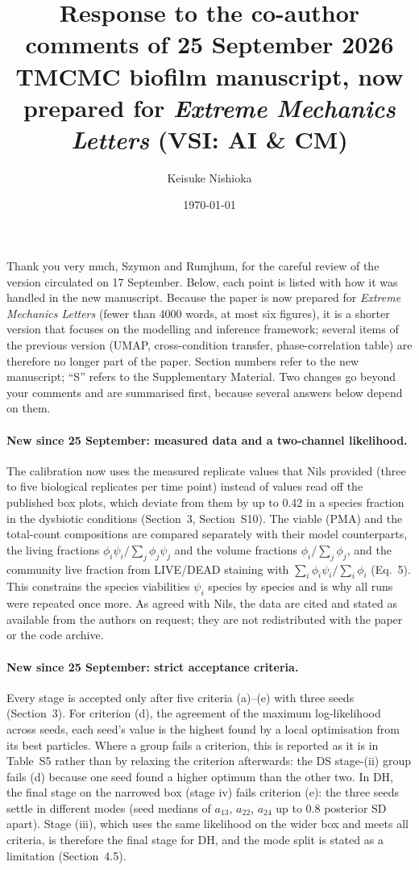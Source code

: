 \documentclass[11pt,a4paper]{article}
\title{Response to the co-author comments of 25 September 2026\\[2pt]
\large TMCMC biofilm manuscript, now prepared for \textit{Extreme Mechanics Letters} (VSI: AI \& CM)}
\author{Keisuke Nishioka}
\date{\today}
\begin{document}
\maketitle

\noindent Thank you very much, Szymon and Rumjhum, for the careful review of the version circulated on 17 September.
Below, each point is listed with how it was handled in the new manuscript.
Because the paper is now prepared for \textit{Extreme Mechanics Letters} (fewer than 4000 words, at most six figures), it is a shorter version that focuses on the modelling and inference framework; several items of the previous version (UMAP, cross-condition transfer, phase-correlation table) are therefore no longer part of the paper.
Section numbers refer to the new manuscript; ``S'' refers to the Supplementary Material.
Two changes go beyond your comments and are summarised first, because several answers below depend on them.

\paragraph{New since 25 September: measured data and a two-channel likelihood.}
The calibration now uses the measured replicate values that Nils provided (three to five biological replicates per time point) instead of values read off the published box plots, which deviate from them by up to 0.42 in a species fraction in the dysbiotic conditions (Section~3, Section~S10).
The viable (PMA) and the total-count compositions are compared separately with their model counterparts, the living fractions $\phi_i\psi_i/\sum_j\phi_j\psi_j$ and the volume fractions $\phi_i/\sum_j\phi_j$, and the community live fraction from LIVE/DEAD staining with $\sum_i\phi_i\psi_i/\sum_i\phi_i$ (Eq.~5).
This constrains the species viabilities $\psi_i$ species by species and is why all runs were repeated once more.
As agreed with Nils, the data are cited and stated as available from the authors on request; they are not redistributed with the paper or the code archive.

\paragraph{New since 25 September: strict acceptance criteria.}
Every stage is accepted only after five criteria (a)--(e) with three seeds (Section~3).
For criterion (d), the agreement of the maximum log-likelihood across seeds, each seed's value is the highest found by a local optimisation from its best particles.
Where a group fails a criterion, this is reported as it is in Table~S5 rather than by relaxing the criterion afterwards: the DS stage-(ii) group fails (d) because one seed found a higher optimum than the other two.
In DH, the final stage on the narrowed box (stage iv) fails criterion (e): the three seeds settle in different modes (seed medians of $a_{13}$, $a_{22}$, $a_{24}$ up to 0.8 posterior SD apart).
Stage (iii), which uses the same likelihood on the wider box and meets all criteria, is therefore the final stage for DH, and the mode split is stated as a limitation (Section~4.5).
\end{document}
